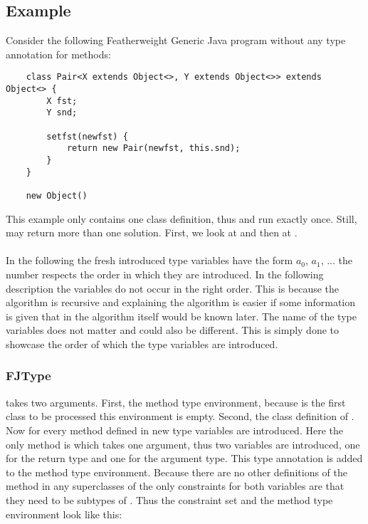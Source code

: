 \subsection{Example}

Consider the following Featherweight Generic Java program without any type annotation for methods:

\begin{verbatim}
    class Pair<X extends Object<>, Y extends Object<>> extends Object<> {
        X fst;
        Y snd;

        setfst(newfst) {
            return new Pair(newfst, this.snd);
        }
    }

    new Object()
\end{verbatim}

This example only contains one class definition, thus  and  run exactly once. Still,  may return more than one solution.
First, we look at  and then at .
\\
\\
In the following the fresh introduced type variables have the form $a_0$, $a_1$, ... the number respects the order in which they are introduced. In the following description the variables do not occur in the right order. This is because the algorithm is recursive and explaining the algorithm is easier
if some information is given that in the algorithm itself would be known later. The name of the type variables does not matter and could also be different. This is simply done to showcase the order of which the type variables are introduced.

\subsubsection{FJType}
 takes two arguments. First, the method type environment, because  is the first class to be processed this environment is empty. Second, the class definition of .
Now for every method defined in  new type variables are introduced. Here the only method is  which takes one argument, thus two variables are introduced, one for the return type and one for the argument type. This type annotation is added to the method type environment.
Because there are no other definitions of the method  in any superclasses of  the only constraints for both variables are that they need to be subtypes of . Thus the constraint set and the method type environment look like this:

